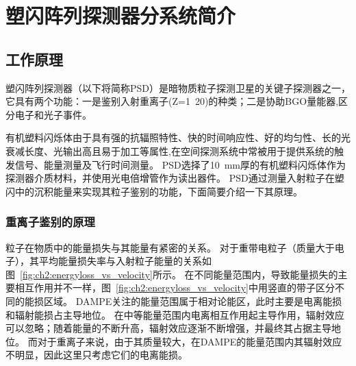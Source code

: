 \chapter{塑闪阵列探测器分系统简介}
\section{工作原理}
\label{sec:psd_principle}
塑闪阵列探测器（以下将简称PSD）是暗物质粒子探测卫星的关键子探测器之一，它具有两个功能：一是鉴别入射重离子(Z=1~20)的种类；二是协助BGO量能器,区分电子和光子事件。

有机塑料闪烁体由于具有强的抗辐照特性、快的时间响应性、好的均匀性、长的光衰减长度、光输出高且易于加工等属性,在空间探测系统中常被用于提供系统的触发信号、能量测量及飞行时间测量。
PSD选择了\SI{10}{\milli\meter}厚的有机塑料闪烁体作为探测器介质材料，并使用光电倍增管作为读出器件。
PSD通过测量入射粒子在塑闪中的沉积能量来实现其粒子鉴别的功能，下面简要介绍一下其原理。

\subsection{重离子鉴别的原理}
粒子在物质中的能量损失与其能量有紧密的关系。
对于重带电粒子（质量大于电子），其平均能量损失率与入射粒子能量的关系如图~\ref{fig:ch2:energyloss_vs_velocity}所示。
在不同能量范围内，导致能量损失的主要相互作用并不一样，图~\ref{fig:ch2:energyloss_vs_velocity}中用竖直的带子区分不同的能损区域。
DAMPE关注的能量范围属于相对论能区，此时主要是电离能损和辐射能损占主导地位。
在中等能量范围内电离相互作用起主导作用，辐射效应可以忽略；随着能量的不断升高，辐射效应逐渐不断增强，并最终其占据主导地位。
而对于重离子来说，由于其质量较大，在DAMPE的能量范围内其辐射效应不明显，因此这里只考虑它们的电离能损。

